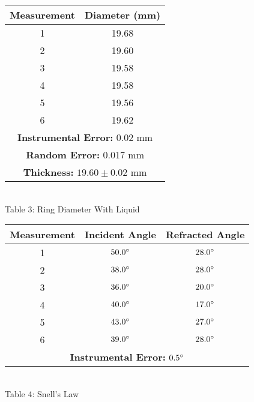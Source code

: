 \begin{center}
\begin{minipage}{.5\linewidth}
        \vspace{10mm}
    \end{minipage} 
    \begin{tabular}{|c|c|}
        \hline
        \textbf{Measurement} & \textbf{Diameter (mm)} \\ \hline
        1 & 19.68 \\ 
        2 & 19.60 \\ 
        3 & 19.58 \\ 
        4 & 19.58 \\ 
        5 & 19.56 \\ 
        6 & 19.62 \\ \hline
        \multicolumn{2}{|c|}{\textbf{Instrumental Error:} 0.02 mm} \\
        \multicolumn{2}{|c|}{\textbf{Random Error:} 0.017 mm} \\
        \multicolumn{2}{|c|}{\textbf{Thickness:} $19.60\pm0.02$ mm} \\ 
        \hline
    \end{tabular}
    \vspace{3mm}
    \\Table 3: Ring Diameter With Liquid
    \begin{tabular}{|c|c c|}
    \hline
        \textbf{Measurement} & \textbf{Incident Angle} & \textbf{Refracted Angle} \\ \hline
        1 & $50.0\degree$ & $28.0\degree$ \\ 
        2 & $38.0\degree$ & $28.0\degree$ \\ 
        3 & $36.0\degree$ & $20.0\degree$ \\ 
        4 & $40.0\degree$ & $17.0\degree$ \\ 
        5 & $43.0\degree$ & $27.0\degree$ \\ 
        6 & $39.0\degree$ & $28.0\degree$ \\ \hline
        \multicolumn{3}{|c|}{\textbf{Instrumental Error:} $0.5\degree$} \\ \hline
    \end{tabular}
    \vspace{3mm}
    \\Table 4: Snell's Law
\end{center}